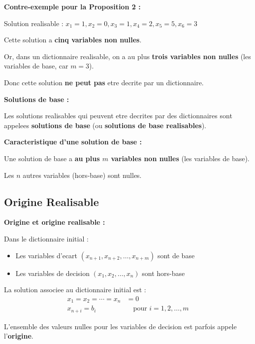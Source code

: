 \documentclass[12pt,a4paper]{article}
\begin{document}
\begin{exemple}
\textbf{Contre-exemple pour la Proposition 2 :}

Solution realisable : $x_1 = 1, x_2 = 0, x_3 = 1, x_4 = 2, x_5 = 5, x_6 = 3$

Cette solution a \textcolor{importantrouge}{\textbf{cinq variables non nulles}}.

Or, dans un dictionnaire realisable, on a au plus \textcolor{defvert}{\textbf{trois variables non nulles}} (les variables de base, car $m = 3$).

Donc cette solution \textcolor{importantrouge}{\textbf{ne peut pas}} etre decrite par un dictionnaire.
\end{exemple}

\begin{definition}
\textbf{Solutions de base :}

Les solutions realisables qui peuvent etre decrites par des dictionnaires sont appelees \textcolor{algoviolet}{\textbf{solutions de base}} (ou \textbf{solutions de base realisables}).
\end{definition}

\begin{astuce}
\textbf{Caracteristique d'une solution de base :}

Une solution de base a \textcolor{titrebleu}{\textbf{au plus $m$ variables non nulles}} (les variables de base).

Les $n$ autres variables (hors-base) sont nulles.
\end{astuce}

\newpage
\subsection{Origine Realisable}

\begin{definition}
\textbf{Origine et origine realisable :}

Dans le dictionnaire initial :
\begin{itemize}
    \item Les variables d'ecart $(x_{n+1}, x_{n+2}, \ldots, x_{n+m})$ sont de base
    \item Les variables de decision $(x_1, x_2, \ldots, x_n)$ sont hors-base
\end{itemize}

La solution associee au dictionnaire initial est :
\begin{align*}
x_1 = x_2 = \cdots = x_n &= 0\\
x_{n+i} = b_i &\quad \text{pour } i = 1, 2, \ldots, m
\end{align*}

L'ensemble des valeurs nulles pour les variables de decision est parfois appele l'\textcolor{defvert}{\textbf{origine}}.
\end{definition}
\end{document}
